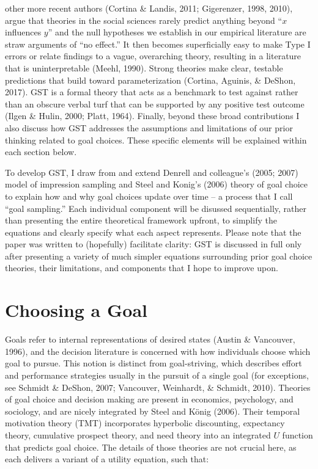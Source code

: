 \documentclass[english,,man]{apa6}
\theoremstyle{definition}
\theoremstyle{definition}
\theoremstyle{definition}
\theoremstyle{remark}
\begin{document}
other more recent authors (Cortina \& Landis, 2011; Gigerenzer, 1998,
2010), argue that theories in the social sciences rarely predict
anything beyond \enquote{\(x\) influences \(y\)} and the null hypotheses
we establish in our empirical literature are straw arguments of
\enquote{no effect.} It then becomes superficially easy to make Type I
errors or relate findings to a vague, overarching theory, resulting in a
literature that is uninterpretable (Meehl, 1990). Strong theories make
clear, testable predictions that build toward parameterization (Cortina,
Aguinis, \& DeShon, 2017). GST is a formal theory that acts as a
benchmark to test against rather than an obscure verbal turf that can be
supported by any positive test outcome (Ilgen \& Hulin, 2000; Platt,
1964). Finally, beyond these broad contributions I also discuss how GST
addresses the assumptions and limitations of our prior thinking related
to goal choices. These specific elements will be explained within each
section below.

To develop GST, I draw from and extend Denrell and colleague's (2005;
2007) model of impression sampling and Steel and Konig's (2006) theory
of goal choice to explain how and why goal choices update over time -- a
process that I call \enquote{goal sampling.} Each individual component
will be disussed sequentially, rather than presenting the entire
theoretical framework upfront, to simplify the equations and clearly
specify what each aspect represents. Please note that the paper was
written to (hopefully) facilitate clarity: GST is discussed in full only
after presenting a variety of much simpler equations surrounding prior
goal choice theories, their limitations, and components that I hope to
improve upon.

\hypertarget{choosing-a-goal}{%
\section{Choosing a Goal}\label{choosing-a-goal}}

Goals refer to internal representations of desired states (Austin \&
Vancouver, 1996), and the decision literature is concerned with how
individuals choose which goal to pursue. This notion is distinct from
goal-striving, which describes effort and performance strategies usually
in the pursuit of a single goal (for exceptions, see Schmidt \& DeShon,
2007; Vancouver, Weinhardt, \& Schmidt, 2010). Theories of goal choice
and decision making are present in economics, psychology, and sociology,
and are nicely integrated by Steel and König (2006). Their temporal
motivation theory (TMT) incorporates hyperbolic discounting, expectancy
theory, cumulative prospect theory, and need theory into an integrated
\(U\) function that predicts goal choice. The details of those theories
are not crucial here, as each delivers a variant of a utility equation,
such that:
\end{document}
